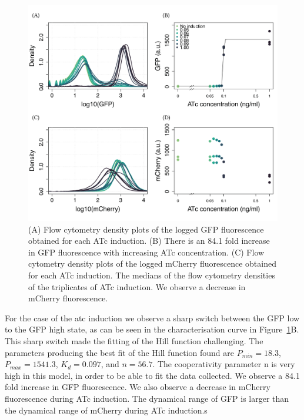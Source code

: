 \begin{figure}[tb]
	\begin{center}
\includegraphics[width=\textwidth]{../../chapters/chapterABCFlow/images/pKDL071_concentrations_ATc-01.png}
\caption[LoF caption]{\label{fig:switch_concentrations_model_atc} (A) Flow cytometry density plots of the logged GFP fluorescence obtained for each ATc induction. (B) There is an 84.1 fold increase in GFP fluorescence with increasing ATc concentration. (C) Flow cytometry density plots of the logged mCherry fluorescence obtained for each ATc induction. The medians of the flow cytometry densities of the triplicates of ATc induction. We observe a decrease in mCherry fluorescence. }
\end{center}
\end{figure}

For the case of the \acrshort{atc} induction we observe a sharp switch between the GFP low to the GFP high state, as can be seen in the characterisation curve in Figure~\ref{fig:switch_concentrations_model_atc}B. This sharp switch made the fitting of the Hill function challenging. The parameters producing the best fit of the Hill function found are $P_{min} = 18.3$, $P_{max}=1541.3$, $K_d=0.097$, and $n=56.7$. The cooperativity parameter n is very high in this model, in order to be able to fit the data collected. We observe a 84.1 fold increase in GFP fluorescence. We also observe a decrease in mCherry fluorescence during ATc induction. The dynamical range of GFP is larger than the dynamical range of mCherry during ATc induction.s




